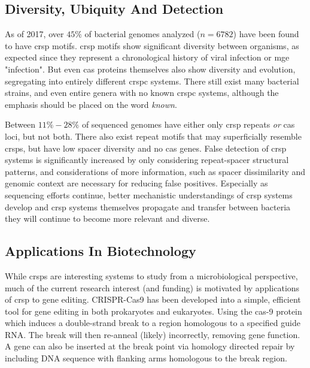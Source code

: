 \subsection{Diversity, Ubiquity And Detection}
As of 2017, over $45\%$ of bacterial genomes analyzed ($n=6782$) have been found to have \ac{crsp} motifs\citep{crispdb}.
\ac{crsp} motifs show significant diversity between organisms, as expected since they represent a chronological history of viral infection or \ac{mge} "infection"\citep{crispgen}.
But even \ac{cas} proteins themselves also show diversity and evolution, segregating into entirely different \ac{crspc} systems\citep{evocas}.
There still exist many bacterial strains, and even entire genera with no known \ac{crspc} systems, although the emphasis should be placed on the word \textit{known}\citep{ineqcas,casguild}.\par
Between $11\%-28\%$ of sequenced genomes have either only \ac{crsp} repeats \textit{or} \ac{cas} loci, but not both\citep{ineqcas}.
There also exist repeat motifs that may superficially resemble \ac{crsp}s, but have low spacer diversity and no \ac{cas} genes\citep{ineqcas}.
False detection of \ac{crsp} systems is significantly increased by only considering repeat-spacer structural patterns, and considerations of more information, such as spacer dissimilarity and genomic context are necessary for reducing false positives\citep{ineqcas}.
Especially as sequencing efforts continue, better mechanistic understandings of \ac{crsp} systems develop and \ac{crsp} systems themselves propagate and transfer between bacteria they will continue to become more relevant and diverse\citep{crispgen}.
\subsection{Applications In Biotechnology}
While \ac{crsp}s are interesting systems to study from a microbiological perspective, much of the current research interest (and funding) is motivated by applications of \ac{crsp} to gene editing.
CRISPR-Cas9 has been developed into a simple, efficient tool for gene editing in both prokaryotes and eukaryotes\citep{crispgen}.
Using the \ac{cas}-9 protein which induces a double-strand break to a region homologous to a specified guide RNA.
The break will then  re-anneal (likely) incorrectly, removing gene function\citep{crispgen}.
A gene can also be inserted at the break point via homology directed repair by including DNA sequence with flanking arms homologous to the break region\citep{crispgen}.

